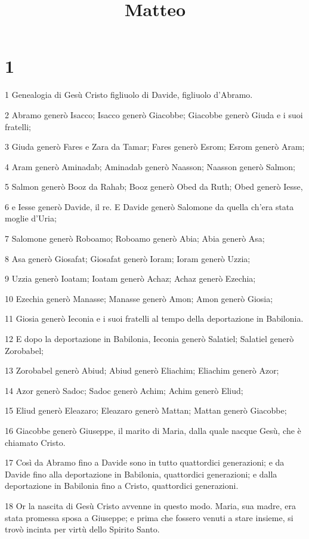 

\title{Matteo}


\chapter{1}

\par 1 Genealogia di Gesù Cristo figliuolo di Davide, figliuolo d'Abramo.
\par 2 Abramo generò Isacco; Isacco generò Giacobbe; Giacobbe generò Giuda e i suoi fratelli;
\par 3 Giuda generò Fares e Zara da Tamar; Fares generò Esrom; Esrom generò Aram;
\par 4 Aram generò Aminadab; Aminadab generò Naasson; Naasson generò Salmon;
\par 5 Salmon generò Booz da Rahab; Booz generò Obed da Ruth; Obed generò Iesse,
\par 6 e Iesse generò Davide, il re. E Davide generò Salomone da quella ch'era stata moglie d'Uria;
\par 7 Salomone generò Roboamo; Roboamo generò Abia; Abia generò Asa;
\par 8 Asa generò Giosafat; Giosafat generò Ioram; Ioram generò Uzzia;
\par 9 Uzzia generò Ioatam; Ioatam generò Achaz; Achaz generò Ezechia;
\par 10 Ezechia generò Manasse; Manasse generò Amon; Amon generò Giosia;
\par 11 Giosia generò Ieconia e i suoi fratelli al tempo della deportazione in Babilonia.
\par 12 E dopo la deportazione in Babilonia, Ieconia generò Salatiel; Salatiel generò Zorobabel;
\par 13 Zorobabel generò Abiud; Abiud generò Eliachim; Eliachim generò Azor;
\par 14 Azor generò Sadoc; Sadoc generò Achim; Achim generò Eliud;
\par 15 Eliud generò Eleazaro; Eleazaro generò Mattan; Mattan generò Giacobbe;
\par 16 Giacobbe generò Giuseppe, il marito di Maria, dalla quale nacque Gesù, che è chiamato Cristo.
\par 17 Così da Abramo fino a Davide sono in tutto quattordici generazioni; e da Davide fino alla deportazione in Babilonia, quattordici generazioni; e dalla deportazione in Babilonia fino a Cristo, quattordici generazioni.
\par 18 Or la nascita di Gesù Cristo avvenne in questo modo. Maria, sua madre, era stata promessa sposa a Giuseppe; e prima che fossero venuti a stare insieme, si trovò incinta per virtù dello Spirito Santo.
